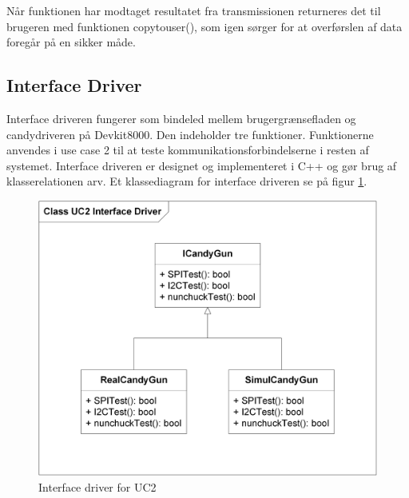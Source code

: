 Når funktionen har modtaget resultatet fra transmissionen returneres det til brugeren med funktionen copy\textunderscore to\textunderscore user(), som igen sørger for at overførslen af data foregår på en sikker måde.   


\subsection{Interface Driver}
Interface driveren fungerer som bindeled mellem brugergrænsefladen og candydriveren på Devkit8000. Den indeholder tre funktioner. Funktionerne anvendes i use case 2 til at teste kommunikationsforbindelserne i resten af systemet. Interface driveren er designet og implementeret i C++ og gør brug af klasserelationen arv. Et klassediagram for interface driveren se på figur  \ref{fig:idriveruc2}.\\

\begin{figure}[H]
	\centering
	\includegraphics[width=\textwidth]{Afsnit/DesignOgImplementering/images/IdriverKlasseDiagram}
	\caption{Interface driver for UC2}
	\label{fig:idriveruc2}
\end{figure}

